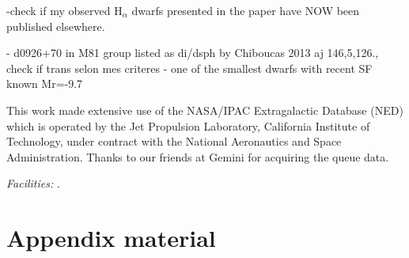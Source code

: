 \documentclass[12pt,preprint]{emulateapj}
\begin{document}
-check if my observed H$_\alpha$ dwarfs presented in the paper have NOW been published elsewhere.

- d0926+70 in M81 group listed as di/dsph by Chiboucas 2013 aj 146,5,126., check if trans selon mes criteres - one of the smallest dwarfs with recent SF known Mr=-9.7

\acknowledgments

This work made extensive use of the NASA/IPAC Extragalactic Database (NED) which is operated by the Jet Propulsion Laboratory, California Institute of Technology, 
under contract with the National Aeronautics and Space Administration. Thanks to our friends at Gemini for acquiring the queue data.


{\it Facilities:}  .


\appendix

\section{Appendix material}

\end{document}
